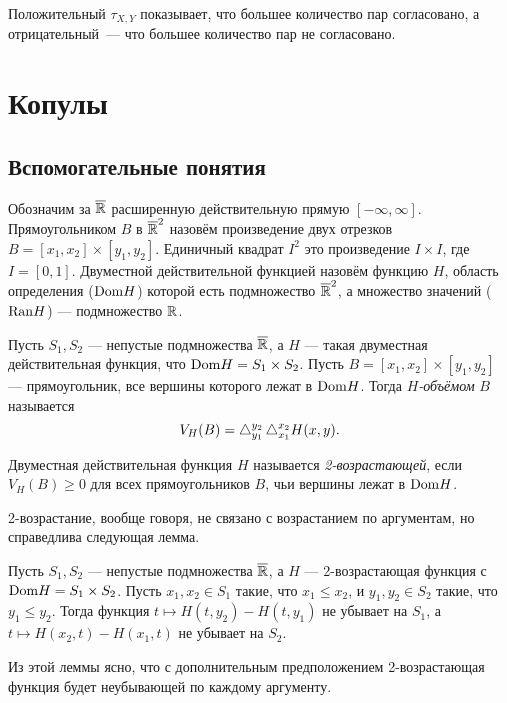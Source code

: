 Положительный $\tau_{X, Y}$ показывает, что большее количество пар согласовано, а отрицательный~--- что большее количество пар не согласовано.

\section*{Копулы}

\subsection*{Вспомогательные понятия}

Обозначим за $\overline{\mathbb{R}}$ расширенную действительную прямую $[-\infty, \infty]$. Прямоугольником $B$ в $\overline{\mathbb{R}}^2$ назовём произведение двух отрезков $B = [x_1, x_2] \times [y_1, y_2]$. Единичный квадрат $I^2$ это произведение $I \times I$, где $I = [0, 1]$. Двуместной действительной функцией назовём функцию $H$, область определения ($\mathrm{Dom}{H}$) которой есть подмножество $\overline{\mathbb{R}}^2$, а множество значений ($\mathrm{Ran}{H}$) --- подмножество $\mathbb{R}$.

\begin{define}
	Пусть $S_1, S_2$ --- непустые подмножества $\overline{\mathbb{R}}$, а $H$ --- такая двуместная действительная функция, что $\mathrm{Dom}{H} = S_1 \times S_2$. Пусть $B = [x_1, x_2] \times [y_1, y_2]$ --- прямоугольник, все вершины которого лежат в $\mathrm{Dom}{H}$. Тогда \emph{$H$-объёмом} $B$ называется
\[
V_H(B) = \mathop{}\!\mathbin\bigtriangleup_{y_1}^{y_2}\mathop{}\!\mathbin\bigtriangleup_{x_1}^{x_2}H(x, y).
\]
\end{define}

\begin{define}
	Двуместная действительная функция $H$ называется \emph{2-возрастающей}, если $V_H(B) \geqslant 0$ для всех прямоугольников $B$, чьи вершины лежат в $\mathrm{Dom}{H}$.
\end{define}

2-возрастание, вообще говоря, не связано с возрастанием по аргументам, но справедлива следующая лемма.

\begin{lemma}
	Пусть $S_1, S_2$ --- непустые подмножества $\overline{\mathbb{R}}$, а $H$ --- 2-возрастающая функция с $\mathrm{Dom}{H} = S_1 \times S_2$. Пусть $x_1, x_2 \in S_1$ такие, что $x_1 \leqslant x_2$, и $y_1, y_2 \in S_2$ такие, что $y_1 \leqslant y_2$. Тогда функция $t \mapsto H(t, y_2) - H(t, y_1)$ не убывает на $S_1$, а $t \mapsto H(x_2, t) - H(x_1, t)$ не убывает на $S_2$.
\end{lemma}

Из этой леммы ясно, что с дополнительным предположением 2-возрастающая функция будет неубывающей по каждому аргументу.

